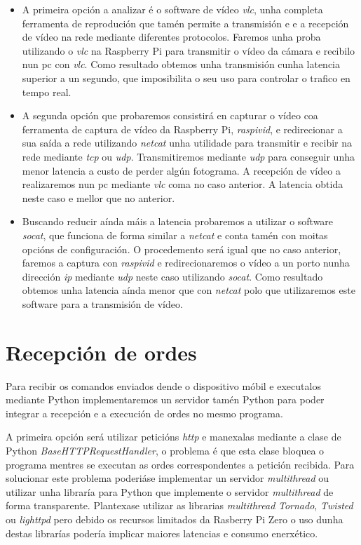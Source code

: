 \begin{itemize}
    \item A primeira opción a analizar é o software de vídeo \emph{vlc}, unha completa ferramenta de reprodución que tamén permite a transmisión e e a recepción de vídeo na rede mediante diferentes protocolos. Faremos unha proba utilizando o \emph{vlc} na Raspberry Pi para transmitir o vídeo da cámara e recibilo nun pc con \emph{vlc}. Como resultado obtemos unha transmisión cunha latencia superior a un segundo, que imposibilita o seu uso para controlar o trafico en tempo real.

    \item A segunda opción que probaremos consistirá en capturar o vídeo coa ferramenta de captura de vídeo da Raspberry Pi, \emph{raspivid}, e redirecionar a sua saída a rede utilizando \emph{netcat} unha utilidade para transmitir e recibir na rede mediante \emph{tcp} ou \emph{udp}. Transmitiremos mediante \emph{udp} para conseguir unha menor latencia a custo de perder algún fotograma. A recepción de vídeo a realizaremos nun pc mediante \emph{vlc} coma no caso anterior. A latencia obtida neste caso e mellor que no anterior.

    \item Buscando reducir aínda máis a latencia probaremos a utilizar o software \emph{socat}, que funciona de forma similar a \emph{netcat} e conta tamén con moitas opcións de configuración. O procedemento será igual que no caso anterior, faremos a captura con \emph{raspivid} e redirecionaremos o vídeo a un porto nunha dirección \emph{ip} mediante \emph{udp} neste caso utilizando \emph{socat}. Como resultado obtemos unha latencia aínda menor que con \emph{netcat} polo que utilizaremos este software para a transmisión de vídeo.
\end{itemize}

\section{Recepción de ordes}

 Para recibir os comandos enviados dende o dispositivo móbil e executalos mediante Python implementaremos un servidor tamén Python para poder integrar a recepción e a execución de ordes no mesmo programa.

 A primeira opción será utilizar peticións \emph{http} e manexalas mediante a clase de Python \emph{BaseHTTPRequestHandler}, o problema é que esta clase bloquea o programa mentres se executan as ordes correspondentes a petición recibida. Para solucionar este problema poderiáse implementar un servidor \emph{multithread} ou utilizar unha libraría para Python que implemente o servidor \emph{multithread} de forma transparente. Plantexase utilizar as librarias \emph{multithread} \emph{Tornado}, \emph{Twisted} ou \emph{lighttpd} pero debido os recursos limitados da Rasberry Pi Zero o uso dunha destas librarías podería implicar maiores latencias e consumo enerxético.

